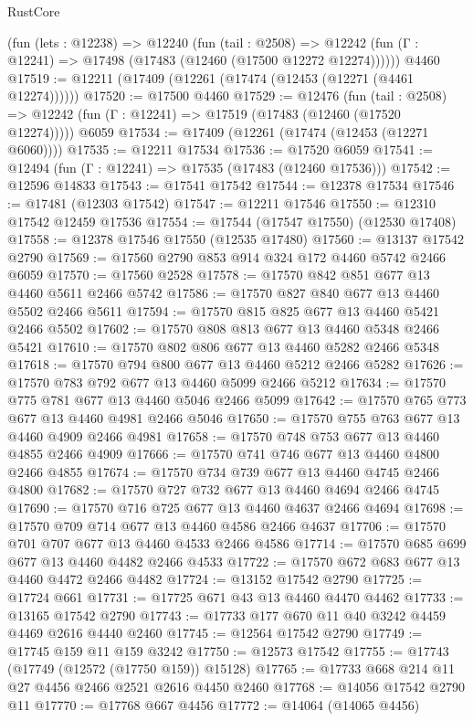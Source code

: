 \begin{lexlean}{RustCore}
\begin{coremodule}
    (fun (lets : @12238) =>
    @12240
      (fun (tail : @2508) =>
      @12242 (fun (Γ : @12241) => @17498 (@17483 (@12460 (@17500 @12272 @12274))))))
    @4460
@17519 := @12211 (@17409 (@12261 (@17474 (@12453 (@12271 (@4461 @12274))))))
@17520 := @17500 @4460
@17529 := @12476
    (fun (tail : @2508) => @12242 (fun (Γ : @12241) => @17519 (@17483 (@12460 (@17520 @12274)))))
    @6059
@17534 := @17409 (@12261 (@17474 (@12453 (@12271 @6060))))
@17535 := @12211 @17534
@17536 := @17520 @6059
@17541 := @12494 (fun (Γ : @12241) => @17535 (@17483 (@12460 @17536)))
@17542 := @12596 @14833
@17543 := @17541 @17542
@17544 := @12378 @17534
@17546 := @17481 (@12303 @17542)
@17547 := @12211 @17546
@17550 := @12310 @17542 @12459 @17536
@17554 := @17544 (@17547 @17550) (@12530 @17408)
@17558 := @12378 @17546 @17550 (@12535 @17480)
@17560 := @13137 @17542 @2790
@17569 := @17560 @2790 @853 @914 @324 @172 @4460 @5742 @2466 @6059
@17570 := @17560 @2528
@17578 := @17570 @842 @851 @677 @13 @4460 @5611 @2466 @5742
@17586 := @17570 @827 @840 @677 @13 @4460 @5502 @2466 @5611
@17594 := @17570 @815 @825 @677 @13 @4460 @5421 @2466 @5502
@17602 := @17570 @808 @813 @677 @13 @4460 @5348 @2466 @5421
@17610 := @17570 @802 @806 @677 @13 @4460 @5282 @2466 @5348
@17618 := @17570 @794 @800 @677 @13 @4460 @5212 @2466 @5282
@17626 := @17570 @783 @792 @677 @13 @4460 @5099 @2466 @5212
@17634 := @17570 @775 @781 @677 @13 @4460 @5046 @2466 @5099
@17642 := @17570 @765 @773 @677 @13 @4460 @4981 @2466 @5046
@17650 := @17570 @755 @763 @677 @13 @4460 @4909 @2466 @4981
@17658 := @17570 @748 @753 @677 @13 @4460 @4855 @2466 @4909
@17666 := @17570 @741 @746 @677 @13 @4460 @4800 @2466 @4855
@17674 := @17570 @734 @739 @677 @13 @4460 @4745 @2466 @4800
@17682 := @17570 @727 @732 @677 @13 @4460 @4694 @2466 @4745
@17690 := @17570 @716 @725 @677 @13 @4460 @4637 @2466 @4694
@17698 := @17570 @709 @714 @677 @13 @4460 @4586 @2466 @4637
@17706 := @17570 @701 @707 @677 @13 @4460 @4533 @2466 @4586
@17714 := @17570 @685 @699 @677 @13 @4460 @4482 @2466 @4533
@17722 := @17570 @672 @683 @677 @13 @4460 @4472 @2466 @4482
@17724 := @13152 @17542 @2790
@17725 := @17724 @661
@17731 := @17725 @671 @43 @13 @4460 @4470 @4462
@17733 := @13165 @17542 @2790
@17743 := @17733 @177 @670 @11 @40 @3242 @4459 @4469 @2616 @4440 @2460
@17745 := @12564 @17542 @2790
@17749 := @17745 @159 @11 @159 @3242
@17750 := @12573 @17542
@17755 := @17743 (@17749 (@12572 (@17750 @159)) @15128)
@17765 := @17733 @668 @214 @11 @27 @4456 @2466 @2521 @2616 @4450 @2460
@17768 := @14056 @17542 @2790 @11
@17770 := @17768 @667 @4456
@17772 := @14064 (@14065 @4456)

\end{coremodule}
\end{lexlean}
